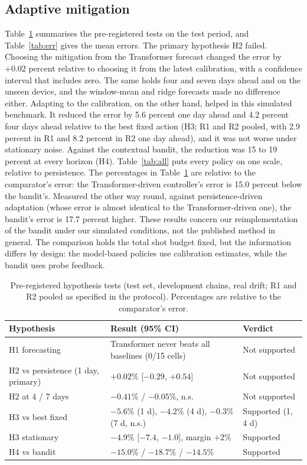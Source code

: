 \documentclass[conference]{IEEEtran}
\begin{document}
\subsection{Adaptive mitigation}
Table~\ref{tab:hyp} summarises the pre-registered tests on the test period, and Table~\ref{tab:err} gives the mean errors. The primary hypothesis H2 failed. Choosing the mitigation from the Transformer forecast changed the error by +0.02 percent relative to choosing it from the latest calibration, with a confidence interval that includes zero. The same holds four and seven days ahead and on the unseen device, and the window-mean and ridge forecasts made no difference either. Adapting to the calibration, on the other hand, helped in this simulated benchmark. It reduced the error by 5.6 percent one day ahead and 4.2 percent four days ahead relative to the best fixed action (H3; R1 and R2 pooled, with 2.9 percent in R1 and 8.2 percent in R2 one day ahead), and it was not worse under stationary noise. Against the contextual bandit, the reduction was 15 to 19 percent at every horizon (H4). Table~\ref{tab:all} puts every policy on one scale, relative to persistence. The percentages in Table~\ref{tab:hyp} are relative to the comparator's error: the Transformer-driven controller's error is 15.0 percent below the bandit's. Measured the other way round, against persistence-driven adaptation (whose error is almost identical to the Transformer-driven one), the bandit's error is 17.7 percent higher. These results concern our reimplementation of the bandit under our simulated conditions, not the published method in general. The comparison holds the total shot budget fixed, but the information differs by design: the model-based policies use calibration estimates, while the bandit uses probe feedback.

\begin{table}[htbp]
\caption{Pre-registered hypothesis tests (test set, development chains, real drift; R1 and R2 pooled as specified in the protocol). Percentages are relative to the comparator's error.}
\begin{center}
\setlength{\tabcolsep}{3pt}
\begin{tabular}{p{2.2cm}p{3.6cm}p{1.6cm}}
\toprule
\textbf{Hypothesis} & \textbf{Result (95\% CI)} & \textbf{Verdict} \\
\midrule
H1 forecasting & Transformer never beats all baselines (0/15 cells) & Not supported \\
H2 vs persistence (1 day, primary) & $+0.02\%$ [$-0.29$, $+0.54$] & Not supported \\
H2 at 4 / 7 days & $-0.41\%$ / $-0.05\%$, n.s. & Not supported \\
H3 vs best fixed & $-5.6\%$ (1 d), $-4.2\%$ (4 d), $-0.3\%$ (7 d, n.s.) & Supported (1, 4 d) \\
H3 stationary & $-4.9\%$ [$-7.4$, $-1.0$], margin $+2\%$ & Supported \\
H4 vs bandit & $-15.0\%$ / $-18.7\%$ / $-14.5\%$ & Supported \\
\bottomrule
\end{tabular}
\label{tab:hyp}
\end{center}
\end{table}
\end{document}
